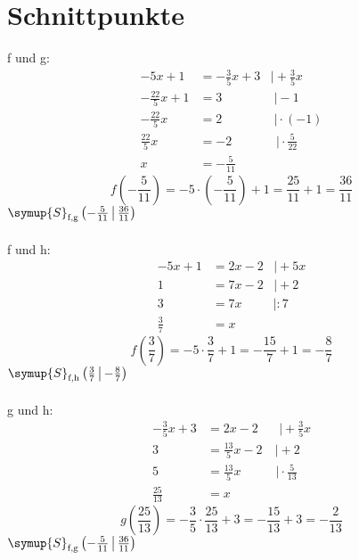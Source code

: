       \section*{Schnittpunkte}
      f und g:
      \begin{align}
            -5x+1&=-\frac{3}{5}x+3\;\;\;|\!+\!\frac{3}{5}x\\
            -\frac{22}{5}x+1&=3\;\;\;\;\;\;\;\;\;\;\;\;\;\;\;|\!-\!1\\
            -\frac{22}{5}x&=2\;\;\;\;\;\;\;\;\;\;\;\;\;\;\;|\!\cdot\!(-1)\\
            \frac{22}{5}x&=-2\;\;\;\;\;\;\;\;\;\;\;\;\:|\!\cdot\!\frac{5}{22}\\
            x&=-\frac{5}{11}
      \end{align}
      \begin{equation}
            f\left(-\frac{5}{11}\right)=-5\cdot\left(-\frac{5}{11}\right)+1=\frac{25}{11}+1=\frac{36}{11}
      \end{equation}
      $\symup{S}_\text{f,g}\left(-\frac{5}{11}\,\middle|\,\frac{36}{11}\right)$\\\\
      f und h:
      \begin{align}
            -5x+1&=2x-2\;\;\;|\!+\!5x\\
            1&=7x-2\;\;\;|\!+\!2\\
            3&=7x\;\;\;\;\;\;\;\;\;|\!:\!7\\
            \frac{3}{7}&=x
      \end{align}
      \begin{equation}
            f\left(\frac{3}{7}\right)=-5\cdot\frac{3}{7}+1=-\frac{15}{7}+1=-\frac{8}{7}
      \end{equation}
      $\symup{S}_\text{f,h}\left(\frac{3}{7}\,\middle|\,-\frac{8}{7}\right)$\\\\
      g und h:
      \begin{align}
            -\frac{3}{5}x+3&=2x-2\;\;\;\;\;\;|\!+\!\frac{3}{5}x\\
            3&=\frac{13}{5}x-2\;\;\;\,|\!+\!2\\
            5&=\frac{13}{5}x\;\;\;\;\;\;\;\;\;\;|\!\cdot\!\frac{5}{13}\\
            \frac{25}{13}&=x
      \end{align}
      \begin{equation}
            g\left(\frac{25}{13}\right)=-\frac{3}{5}\cdot\frac{25}{13}+3=-\frac{15}{13}+3=-\frac{2}{13}
      \end{equation}
      $\symup{S}_\text{f,g}\left(-\frac{5}{11}\,\middle|\,\frac{36}{11}\right)$

